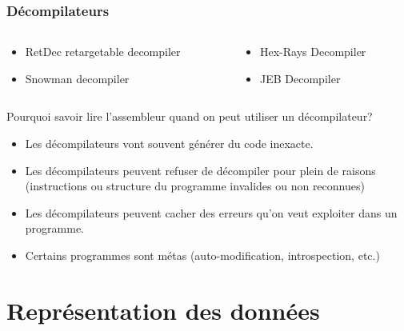 \documentclass[10pt,xcolor={table,dvipsnames},t]{beamer}
\begin{document}
\begin{frame}
    \frametitle{Décompilateurs}
    
    \begin{columns}[T]
        \begin{column}{0.48\textwidth}
            \begin{itemize}
                \item RetDec retargetable decompiler 
                \item Snowman decompiler 
            \end{itemize}
        \end{column}
        \begin{column}{0.48\textwidth}
            \begin{itemize}
                \item Hex-Rays Decompiler
                \item JEB Decompiler \newline
            \end{itemize}
        \end{column}
    \end{columns}
    
    Pourquoi savoir lire l'assembleur quand on peut utiliser un décompilateur?
    
    \begin{itemize}
        \item Les décompilateurs vont souvent générer du code inexacte.
        \item Les décompilateurs peuvent refuser de décompiler pour plein de raisons (instructions ou structure du programme invalides ou non reconnues)
        \item Les décompilateurs peuvent cacher des erreurs qu'on veut exploiter dans un programme.
        \item Certains programmes sont métas (auto-modification, introspection, etc.)
    \end{itemize}
    
\end{frame}


\section{Représentation des données}
\end{document}
